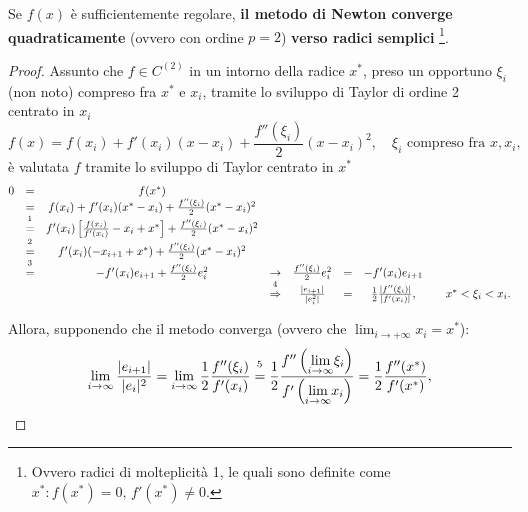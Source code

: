 \begin{theorem}\label{th:metodo_newton_converge_quadraticamente}
	Se $f(x)$ è sufficientemente regolare, \textbf{il metodo di Newton converge quadraticamente} (ovvero con ordine $p=2$) \textbf{verso radici semplici} \footnote{Ovvero radici di molteplicità 1, le quali sono definite come $x^*:f(x^*)=0,\, f'(x^*)\neq 0$.}.
\end{theorem}
\begin{proof}
	Assunto che $f\in C^{(2)}$ in un intorno della radice $x^*$, preso un opportuno $\xi_i$ (non noto) compreso fra $x^*$ e $x_i$, tramite lo sviluppo di Taylor di ordine 2 centrato in $x_i$
	\begin{equation*}
		f(x)=f(x_i)+f'(x_i)(x-x_i)+\frac{f''(\xi_i)}{2}(x-x_i)^2, \quad \xi_i \text{ compreso fra }x,x_i,
	\end{equation*}
	è valutata $f$ tramite lo sviluppo di Taylor centrato in $x^*$
	\begin{equation*}
		\begin{matrix}
			0 &=& f(x^*)\\
			&=& f(x_i)+f'(x_i)(x^*-x_i)+\frac{f''(\xi_i)}{2}(x^*-x_i)^2 \\
			&\overset{\footnotemark}{=}& f'(x_i)\left[\frac{f(x_i)}{f'(x_i)}-x_i+x^*\right]+\frac{f''(\xi_i)}{2}(x^*-x_i)^2 \\
			&\overset{\footnotemark}{=}&f'(x_i)(-x_{i+1}+x^*)+\frac{f''(\xi_i)}{2}(x^*-x_i)^2\\
			&\overset{\footnotemark}{=}&-f'(x_i)e_{i+1}+\frac{f''(\xi_i)}{2}e_i^2 &\rightarrow&\frac{f''(\xi_i)}{2}e_i^2 &=& -f'(x_i)e_{i+1}\\
			&&&\overset{\footnotemark}{\Rightarrow}& \frac{|e_{i+1}|}{|e_i^2|} &=& \frac{1}{2}\frac{|f''(\xi_i)|}{|f'(x_i)|}, && x^*<\xi_i<x_i.
		\end{matrix}
	\end{equation*}
	\addtocounter{footnote}{-3}
	
	
	
	
	\noindent Allora, supponendo che il metodo converga (ovvero che $\lim_{i\rightarrow+\infty}x_i=x^*$): 
	\begin{equation*}
		\lim_{i\to\infty}{\frac{|e_{i+1}|}{|e_i|^2}}=\lim_{i\to\infty}{\frac{1}{2}\frac{f''(\xi_i)}{f'(x_i)}}\overset{\footnotemark}{=}\frac{1}{2}\frac{f''\left(\underset{i\to\infty}{\lim}\xi_i\right)}{f'\left(\underset{i\to\infty}{\lim}{x_i}\right)}=\frac{1}{2}\frac{f''(x^*)}{f'(x^*)},
	\end{equation*}
	

\end{proof}
